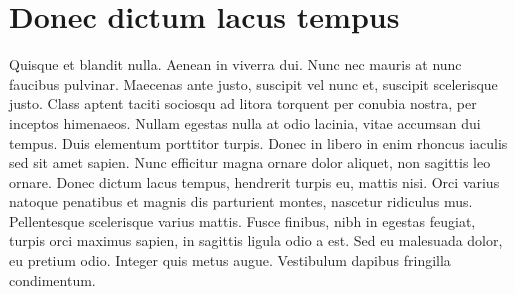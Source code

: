 \section{Donec dictum lacus tempus}
 Quisque et blandit nulla. Aenean in viverra dui. Nunc nec mauris at nunc faucibus pulvinar. 
 Maecenas ante justo, suscipit vel nunc et, suscipit scelerisque justo. Class aptent taciti 
 sociosqu ad litora torquent per conubia nostra, per inceptos himenaeos. Nullam egestas 
 nulla at odio lacinia, vitae accumsan dui tempus. Duis elementum porttitor turpis. Donec 
 in libero in enim rhoncus iaculis sed sit amet sapien. Nunc efficitur magna ornare dolor 
 aliquet, non sagittis leo ornare. Donec dictum lacus tempus, hendrerit turpis eu, mattis 
 nisi. Orci varius natoque penatibus et magnis dis parturient montes, nascetur ridiculus 
 mus. Pellentesque scelerisque varius mattis. Fusce finibus, nibh in egestas feugiat, 
 turpis orci maximus sapien, in sagittis ligula odio a est. Sed eu malesuada dolor, eu 
 pretium odio. Integer quis metus augue. Vestibulum dapibus fringilla condimentum.